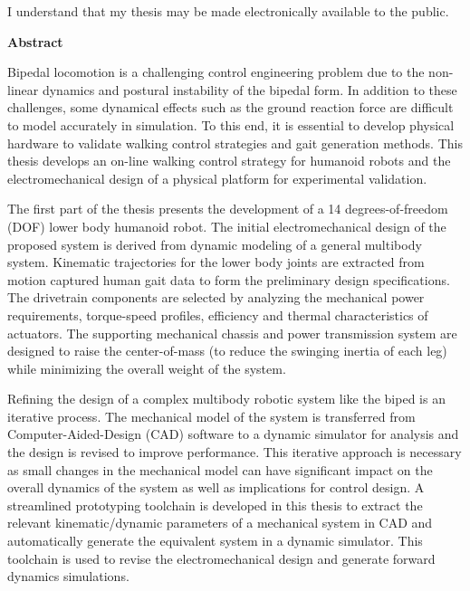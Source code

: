\bigskip
  
\noindent
I understand that my thesis may be made electronically available to the public.

\cleardoublepage


\begin{center}
    \textbf{Abstract}
\end{center}

Bipedal locomotion is a challenging control engineering problem due to the non-linear dynamics and postural instability of the bipedal form. In addition to these challenges, some dynamical effects such as the ground reaction force are difficult to model accurately in simulation. To this end, it is essential to develop physical hardware to validate walking control strategies and gait generation methods. This thesis develops an on-line walking control strategy for humanoid robots and the electromechanical design of a physical platform for experimental validation. 

The first part of the thesis presents the development of a 14 degrees-of-freedom (DOF) lower body humanoid robot. The initial electromechanical design of the proposed system is derived from dynamic modeling of a general multibody system. Kinematic trajectories for the lower body joints are extracted from motion captured human gait data to form the preliminary design specifications. The drivetrain components are selected by analyzing the mechanical power requirements, torque-speed profiles, efficiency and thermal characteristics of actuators. The supporting mechanical chassis and power transmission system are designed to raise the center-of-mass (to reduce the swinging inertia of each leg) while minimizing the overall weight of the system. 

Refining the design of a complex multibody robotic system like the biped is an iterative process. The mechanical model of the system is transferred from Computer-Aided-Design (CAD) software to a dynamic simulator for analysis and the design is revised to improve performance. This iterative approach is necessary as small changes in the mechanical model can have significant impact on the overall dynamics of the system as well as implications for control design. A streamlined prototyping toolchain is developed in this thesis to extract the relevant kinematic/dynamic parameters of a mechanical system in CAD and automatically generate the equivalent system in a dynamic simulator. This toolchain is used to revise the electromechanical design and generate forward dynamics simulations. 

